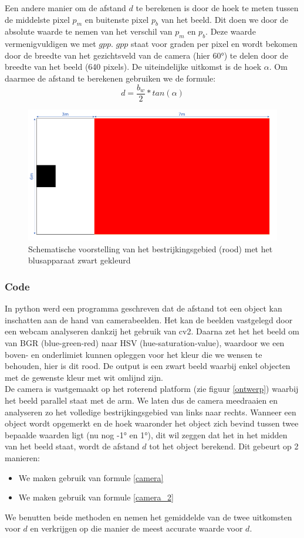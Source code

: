 \documentclass[kulak]{kulakarticle} %
\begin{document}
Een andere manier om de afstand \(d\) te berekenen is door de hoek te meten tussen de middelste pixel \(p_m\) en buitenste pixel \(p_b\) van het beeld. Dit doen we door de absolute waarde te nemen van het verschil van \(p_m\) en \(p_b\). Deze waarde vermenigvuldigen we met \(gpp\). \(gpp\) staat voor graden per pixel en wordt bekomen door de breedte van het gezichtsveld van de camera (hier 60°) te delen door de breedte van het beeld (640 pixels). De uiteindelijke uitkomst is de hoek \(\alpha\). Om daarmee de afstand te berekenen gebruiken we de formule:
\begin{equation} \label{camera_2}
	d = \frac{b_w}{2} * tan(\alpha)
\end{equation}

\begin{figure} [h!]
	\centering                
	\includegraphics[width = .5 \textwidth]{schematische voorstelling bestrijkingsgebied LATEX}
	\caption{Schematische voorstelling van het bestrijkingsgebied (rood) met het blusapparaat zwart gekleurd}
	\label{bestrijkingsgebied}
\end{figure}

\subsubsection{Code}
In python werd een programma geschreven dat de afstand tot een object kan inschatten aan de hand van camerabeelden. Het kan de beelden vastgelegd door een webcam analyseren dankzij het gebruik van cv2. Daarna zet het het beeld om van BGR (blue-green-red) naar HSV (hue-saturation-value), waardoor we een boven- en onderlimiet kunnen opleggen voor het kleur die we wensen te behouden, hier is dit rood. De output is een zwart beeld waarbij enkel objecten met de gewenste kleur met wit omlijnd zijn.\\
De camera is vastgemaakt op het roterend platform (zie figuur \ref{ontwerp}) waarbij het beeld parallel staat met de arm. We laten dus de camera meedraaien en analyseren zo het volledige bestrijkingsgebied van links naar rechts. Wanneer een object wordt opgemerkt en de hoek waaronder het object zich bevind tussen twee bepaalde waarden ligt (nu nog -1° en 1°), dit wil zeggen dat het in het midden van het beeld staat, wordt de afstand \(d\) tot het object berekend. Dit gebeurt op 2 manieren: 
\begin{itemize}
	\item We maken gebruik van formule \ref{camera}
	\item We maken gebruik van formule \ref{camera_2}
\end{itemize}
We benutten beide methoden en nemen het gemiddelde van de twee uitkomsten voor \(d\) en verkrijgen op die manier de meest accurate waarde voor \(d\).
\end{document}
